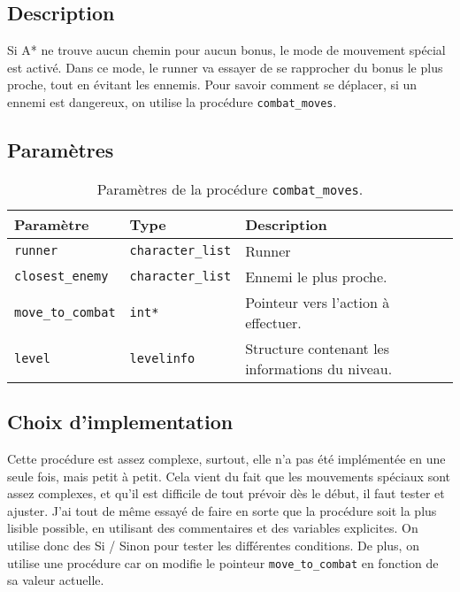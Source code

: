 \subsection{Description}

Si A* ne trouve aucun chemin pour aucun bonus, le mode de mouvement spécial est activé.
Dans ce mode, le runner va essayer de se rapprocher du bonus le plus proche, tout en évitant les ennemis.
Pour savoir comment se déplacer, si un ennemi est dangereux, on utilise la procédure \texttt{combat\_moves}.


\subsection{Paramètres}

\begin{table}[!htpb]
    \begin{tabularx}{\textwidth}{lXX}
        \toprule
        \textbf{Paramètre} & \textbf{Type} & \textbf{Description} \\
        \midrule
        \texttt{runner} & \texttt{character\_list} & Runner \\
        \texttt{closest\_enemy} & \texttt{character\_list} & Ennemi le plus proche. \\
        \texttt{move\_to\_combat} & \texttt{int*} & Pointeur vers l'action à effectuer. \\
        \texttt{level} & \texttt{levelinfo} & Structure contenant les informations du niveau. \\
        \bottomrule
    \end{tabularx}
    \caption{Paramètres de la procédure \texttt{combat\_moves}.}
    \label{tab:parameters-combat_moves}
\end{table}

\subsection{Choix d'implementation}

Cette procédure est assez complexe, surtout, elle n'a pas été implémentée en une seule fois, mais petit à petit.
Cela vient du fait que les mouvements spéciaux sont assez complexes, et qu'il est difficile de tout prévoir dès le début, il faut tester et ajuster.
J'ai tout de même essayé de faire en sorte que la procédure soit la plus lisible possible, en utilisant des commentaires et des variables explicites.
On utilise donc des Si / Sinon pour tester les différentes conditions.
De plus, on utilise une procédure car on modifie le pointeur \texttt{move\_to\_combat} en fonction de sa valeur actuelle.

